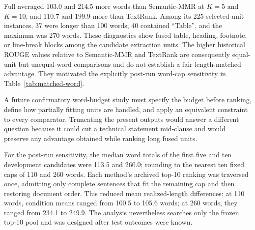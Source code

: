 \documentclass[information,article,submit,moreauthors]{Definitions/mdpi}
\begin{document}
Full averaged 103.0 and 214.5 more words than Semantic-MMR at $K=5$ and $K=10$, and 110.7 and 199.9 more than TextRank. Among its 225 selected-unit instances, 37 were longer than 100 words, 40 contained ``Table'', and the maximum was 270 words. These diagnostics show fused table, heading, footnote, or line-break blocks among the candidate extraction units. The higher historical ROUGE values relative to Semantic-MMR and TextRank are consequently equal-unit but unequal-word comparisons and do not establish a fair length-matched advantage. They motivated the explicitly post-run word-cap sensitivity in Table~\ref{tab:matched-word}.

A future confirmatory word-budget study must specify the budget before ranking, define how partially fitting units are handled, and apply an equivalent constraint to every comparator. Truncating the present outputs would answer a different question because it could cut a technical statement mid-clause and would preserve any advantage obtained while ranking long fused units.

For the post-run sensitivity, the median word totals of the first five and ten development candidates were 113.5 and 260.0; rounding to the nearest ten fixed caps of 110 and 260 words. Each method's archived top-10 ranking was traversed once, admitting only complete sentences that fit the remaining cap and then restoring document order. This reduced mean realized-length differences: at 110 words, condition means ranged from 100.5 to 105.6 words; at 260 words, they ranged from 234.1 to 249.9. The analysis nevertheless searches only the frozen top-10 pool and was designed after test outcomes were known.

\begin{table}[htbp]
\caption{Post-run matched-word sensitivity using equal-weight report-series estimands. The 15 reports form 10 frozen series. Intervals use 10,000 series bootstrap draws; exact values enumerate all 1024 series sign assignments and are Holm-adjusted across six contrasts.}
\label{tab:matched-word}
\centering\small
{}
\end{table}
\end{document}
